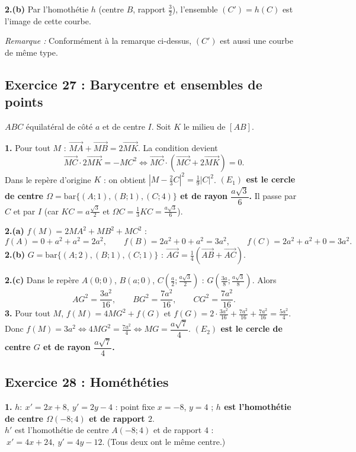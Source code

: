 \documentclass[11pt,a4paper]{article}
\newcommand{\vect}[1]{\overrightarrow{#1}}
\newenvironment{rem}{\par\medskip\noindent\textit{Remarque :}\quad}{\par\medskip}
\begin{document}
\textbf{2.(b)} Par l'homoth\'etie $h$ (centre $B$, rapport $\frac32$), l'ensemble $(C')=h(C)$ est l'image de cette courbe.
\begin{rem} Conform\'ement \`a la remarque ci-dessus, $(C')$ est aussi une courbe de m\^eme type.\end{rem}

\subsection{Exercice 27 : Barycentre et ensembles de points}

$ABC$ \'equilat\'eral de c\^ot\'e $a$ et de centre $I$. Soit $K$ le milieu de $[AB]$.

\textbf{1.} Pour tout $M$ : $\vect{MA}+\vect{MB}=2\vect{MK}$. La condition devient
\[
\vect{MC}\cdot2\vect{MK}=-MC^2\iff\vect{MC}\cdot\left(\vect{MC}+2\vect{MK}\right)=0.
\]
Dans le rep\`ere d'origine $K$ : on obtient $|M-\tfrac23C|^2=\tfrac19|C|^2$.
\textbf{$(E_1)$ est le cercle de centre $\Omega=\mathrm{bar}\{(A;1),(B;1),(C;4)\}$ et de rayon $\dfrac{a\sqrt3}{6}$.}
Il passe par $C$ et par $I$ (car $KC=a\frac{\sqrt3}{2}$ et $\Omega C=\frac13KC=\frac{a\sqrt3}{6}$).

\textbf{2.(a)} $f(M)=2MA^2+MB^2+MC^2$ :
\[
f(A)=0+a^2+a^2=2a^2,\qquad f(B)=2a^2+0+a^2=3a^2,\qquad f(C)=2a^2+a^2+0=3a^2.
\]
\textbf{2.(b)} $G=\mathrm{bar}\{(A;2),(B;1),(C;1)\}$ : $\vect{AG}=\tfrac14(\vect{AB}+\vect{AC})$.

\textbf{2.(c)} Dans le rep\`ere $A(0;0)$, $B(a;0)$, $C\left(\tfrac a2;\tfrac{a\sqrt3}{2}\right)$ :
$G\left(\tfrac{3a}{8};\tfrac{a\sqrt3}{8}\right)$. Alors
\[
AG^2=\frac{3a^2}{16},\qquad BG^2=\frac{7a^2}{16},\qquad CG^2=\frac{7a^2}{16}.
\]
\textbf{3.} Pour tout $M$, $f(M)=4MG^2+f(G)$ et $f(G)=2\cdot\frac{3a^2}{16}+\frac{7a^2}{16}+\frac{7a^2}{16}=\frac{5a^2}{4}$.
Donc $f(M)=3a^2\iff 4MG^2=\frac{7a^2}{4}\iff MG=\dfrac{a\sqrt7}{4}$.
\textbf{$(E_2)$ est le cercle de centre $G$ et de rayon $\dfrac{a\sqrt7}{4}$.}

\subsection{Exercice 28 : Hom\'eth\'eties}

\textbf{1.} $h:\ x'=2x+8,\ y'=2y-4$ : point fixe $x=-8$, $y=4$ ; \textbf{$h$ est l'homoth\'etie de centre $\Omega(-8;4)$ et de rapport $2$}.
\\ $h'$ est l'homoth\'etie de centre $A(-8;4)$ et de rapport $4$ : $\ x'=4x+24,\ y'=4y-12$.
(Tous deux ont le m\^eme centre.)
\end{document}

